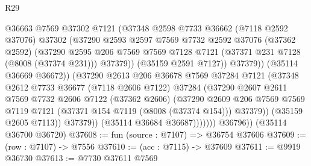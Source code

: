 \begin{lexlean}{R29}
\begin{coremodule}
                            @36663
                            @7569
                            @37302
                            @7121
                            (@37348
                              @2598
                              @7733
                              @36662
                              (@7118 @2592 @37076)
                              @37302
                              (@37290
                                @2593
                                @2597
                                @7569
                                @7732
                                @2592
                                @37076
                                (@37362 @2592)
                                (@37290
                                  @2595
                                  @206
                                  @7569
                                  @7569
                                  @7128
                                  @7121
                                  (@37371 @231 @7128 (@8008 (@37374 @231)))
                                  @37379))
                              (@35159 @2591 @7127))
                            @37379))
                        (@35114 @36669 @36672))
                      (@37290
                        @2613
                        @206
                        @36678
                        @7569
                        @37284
                        @7121
                        (@37348
                          @2612
                          @7733
                          @36677
                          (@7118 @2606 @7122)
                          @37284
                          (@37290
                            @2607
                            @2611
                            @7569
                            @7732
                            @2606
                            @7122
                            (@37362 @2606)
                            (@37290
                              @2609
                              @206
                              @7569
                              @7569
                              @7119
                              @7121
                              (@37371 @154 @7119 (@8008 (@37374 @154)))
                              @37379))
                          (@35159 @2605 @7113))
                        @37379))
                    (@35114 @36684 @36687)))))))
        @36796))
    (@35114 @36700 @36720)
@37608 := fun (source : @7107) => @36754 @37606
@37609 := (row : @7107) -> @7556
@37610 := (acc : @7115) -> @37609
@37611 := @9919 @36730
@37613 := @7730 @37611 @7569

\end{coremodule}
\end{lexlean}
